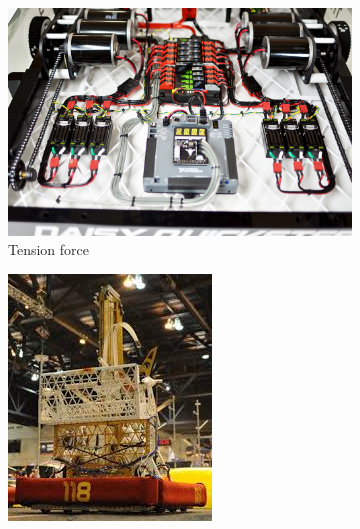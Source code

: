 \documentclass[12pt, letterpaper]{article}
\begin{document}
\begin{figure}[H]
	\centering
	\label{fig:forces}
	\begin{subfigure}[t]{.3\linewidth}
		\includegraphics[width=\linewidth]{frc-ex1}
		\caption{Tension force}
	\end{subfigure}
	\begin{subfigure}[t]{.3\linewidth}
		\includegraphics[width=\linewidth]{frc-ex2}

\end{subfigure}
\end{figure}
\end{document}
